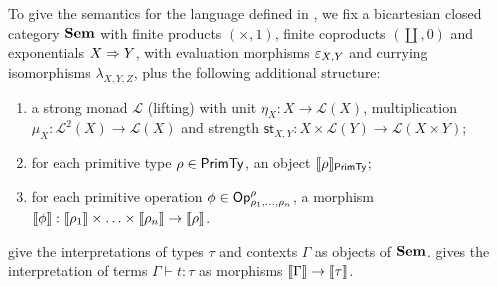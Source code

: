 To give the semantics for the language defined in , we fix a bicartesian closed
category $\mathbf{Sem}$ with finite products $(\times, 1)$, finite coproducts $(\coprod, 0)$ and exponentials
$X \Rightarrow Y$, with evaluation morphisms $\varepsilon_{X,Y}$ and currying isomorphisms $\lambda_{X,Y,Z}$,
plus the following additional structure:
\begin{enumerate}
\item a strong monad $\mathcal{L}$ (lifting) with unit $\eta_X: X \to \mathcal{L}(X)$, multiplication $\mu_X:
\mathcal{L}^2(X) \to \mathcal{L}(X)$ and strength $\mathsf{st}_{X,Y}: X \times \mathcal{L}(Y) \to
\mathcal{L}(X \times Y)$;
\item for each primitive type $\rho \in \mathsf{PrimTy}$, an object $\llbracket \rho \rrbracket_{\mathsf{PrimTy}}$;
\item for each primitive operation $\phi \in \mathsf{Op}^\rho_{\rho_1,\ldots,\rho_n}$, a morphism $\llbracket \phi \rrbracket:
\llbracket \rho_1 \rrbracket \times \ldots \times \llbracket \rho_n \rrbracket \to \llbracket \rho \rrbracket$.
\end{enumerate}

 give the interpretations of types $\tau$ and contexts $\Gamma$
as objects of $\mathbf{Sem}$.  gives the interpretation of terms $\Gamma \vdash t: \tau$ as
morphisms $\llbracket \Gamma \rrbracket \to \llbracket \tau \rrbracket$.

